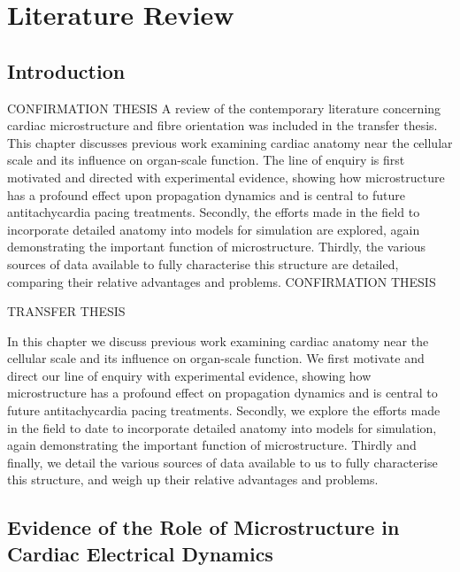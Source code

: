 \chapter{Literature Review}
\dblspace
\begin{quote}{\em }\end{quote}

\section{Introduction}
\label{sec:review:introduction}
CONFIRMATION THESIS
A review of the contemporary literature concerning cardiac microstructure and fibre orientation was included in the transfer thesis. This chapter discusses previous work examining cardiac anatomy near the cellular scale and its influence on organ-scale function. The line of enquiry is first motivated and directed with experimental evidence, showing how microstructure has a profound effect upon propagation dynamics and is central to future antitachycardia pacing treatments. Secondly, the efforts made in the field to incorporate detailed anatomy into models for simulation are explored, again demonstrating the important function of microstructure. Thirdly, the various sources of data available to fully characterise this structure are detailed, comparing their relative advantages and problems.
CONFIRMATION THESIS

TRANSFER THESIS

In this chapter we discuss previous work examining cardiac anatomy near the cellular scale and its influence on organ-scale function. We first motivate and direct our line of enquiry with experimental evidence, showing how microstructure has a profound effect on propagation dynamics and is central to future antitachycardia pacing treatments. Secondly, we explore the efforts made in the field to date to incorporate detailed anatomy into models for simulation, again demonstrating the important function of microstructure. Thirdly and finally, we detail the various sources of data available to us to fully characterise this structure, and weigh up their relative advantages and problems.
\section{Evidence of the Role of Microstructure in Cardiac Electrical Dynamics} %
\label{sec:microstructure_has_profound_macroscopic_effects_on_propagation_dynamics}

